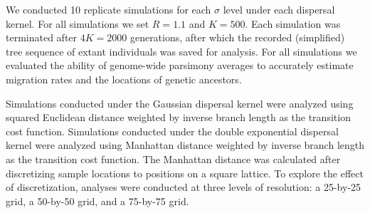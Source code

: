 We conducted 10 replicate simulations for each $\sigma$ level under each 
dispersal kernel. For all simulations we set $R=1.1$ and $K=500$. Each
simulation was terminated after $4K = 2000$ generations, after which the
recorded (simplified) tree sequence of extant individuals was saved for 
analysis. For all simulations we evaluated the ability of genome-wide parsimony
averages to accurately estimate migration rates and the locations of genetic 
ancestors.

Simulations conducted under the Gaussian dispersal kernel were analyzed using
squared Euclidean distance weighted by inverse branch length as the transition
cost function. Simulations conducted under the double exponential dispersal
kernel were analyzed using Manhattan distance weighted by inverse branch length
as the transition cost function. The Manhattan distance was calculated after 
discretizing sample locations to positions on a square lattice. To explore the
effect of discretization, analyses were conducted at three levels of resolution: 
a 25-by-25 grid, a 50-by-50 grid, and a 75-by-75 grid.
